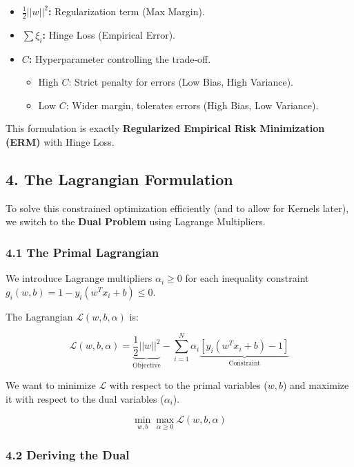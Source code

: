 \documentclass[
  italian,
  11pt,
]{article}
\begin{document}
\begin{itemize}
\item
  \textbf{\(\frac{1}{2}||w||^2\):} Regularization term (Max Margin).
\item
  \textbf{\(\sum \xi_i\):} Hinge Loss (Empirical Error).
\item
  \textbf{\(C\):} Hyperparameter controlling the trade-off.

  \begin{itemize}
  \item
    High \(C\): Strict penalty for errors (Low Bias, High Variance).
  \item
    Low \(C\): Wider margin, tolerates errors (High Bias, Low Variance).
  \end{itemize}
\end{itemize}

This formulation is exactly \textbf{Regularized Empirical Risk
Minimization (ERM)} with Hinge Loss.

\subsection{4. The Lagrangian
Formulation}\label{the-lagrangian-formulation}

To solve this constrained optimization efficiently (and to allow for
Kernels later), we switch to the \textbf{Dual Problem} using Lagrange
Multipliers.

\subsubsection{4.1 The Primal Lagrangian}\label{the-primal-lagrangian}

We introduce Lagrange multipliers \(\alpha_i \geq 0\) for each
inequality constraint \(g_i(w, b) = 1 - y_i(w^T x_i + b) \leq 0\).

The Lagrangian \(\mathcal{L}(w, b, \alpha)\) is:

\[\mathcal{L}(w, b, \alpha) = \underbrace{\frac{1}{2} ||w||^2}_{\text{Objective}} - \sum_{i=1}^N \alpha_i \underbrace{[y_i (w^T x_i + b) - 1]}_{\text{Constraint}}\]

We want to minimize \(\mathcal{L}\) with respect to the primal variables
(\(w, b\)) and maximize it with respect to the dual variables
(\(\alpha_i\)).

\[\min_{w, b} \max_{\alpha \geq 0} \mathcal{L}(w, b, \alpha)\]

\subsubsection{4.2 Deriving the Dual}\label{deriving-the-dual}
\end{document}
